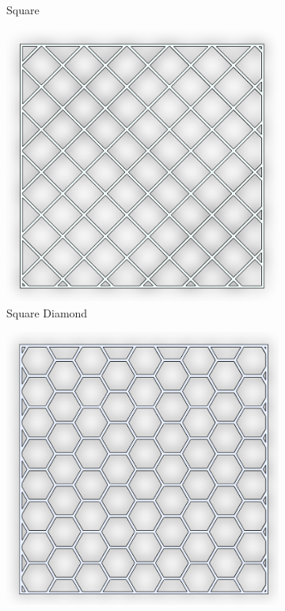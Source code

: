 \documentclass[12pt, letterpaper]{article}
\begin{document}
\begin{figure}[H]
\begin{subfigure}[b]{.3\linewidth}
		\caption{Square}
	\end{subfigure}
	\begin{subfigure}[b]{.3\linewidth}
		\includegraphics[width=\linewidth]{square-diamond}
		\caption{Square Diamond}
	\end{subfigure}
	\begin{subfigure}[b]{.3\linewidth}
		\includegraphics[width=\linewidth]{hex}

\end{subfigure}
\end{figure}
\end{document}
